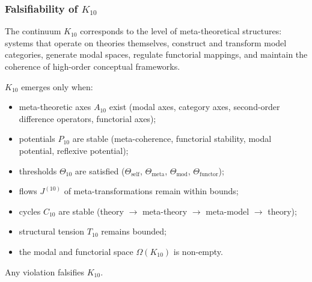 
\subsubsection{Falsifiability of $K_{10}$}
\label{sec:falsifiability-k10}

The continuum $K_{10}$ corresponds to the level of meta-theoretical
structures: systems that operate on theories themselves, construct and transform
model categories, generate modal spaces, regulate functorial mappings,
and maintain the coherence of high-order conceptual frameworks.

$K_{10}$ emerges only when:

\begin{itemize}
    \item meta-theoretic axes $A_{10}$ exist (modal axes, category axes,
          second-order difference operators, functorial axes);
    \item potentials $P_{10}$ are stable (meta-coherence, functorial stability,
          modal potential, reflexive potential);
    \item thresholds $\Theta_{10}$ are satisfied
          ($\Theta_{\mathrm{self}}$, $\Theta_{\mathrm{meta}}$, $\Theta_{\mathrm{mod}}$,
           $\Theta_{\mathrm{functor}}$);
    \item flows $J^{(10)}$ of meta-transformations remain within bounds;
    \item cycles $C_{10}$ are stable 
          (theory $\rightarrow$ meta-theory $\rightarrow$ meta-model 
          $\rightarrow$ theory);
    \item structural tension $T_{10}$ remains bounded;
    \item the modal and functorial space $\Omega(K_{10})$ is non-empty.
\end{itemize}

Any violation falsifies $K_{10}$.




